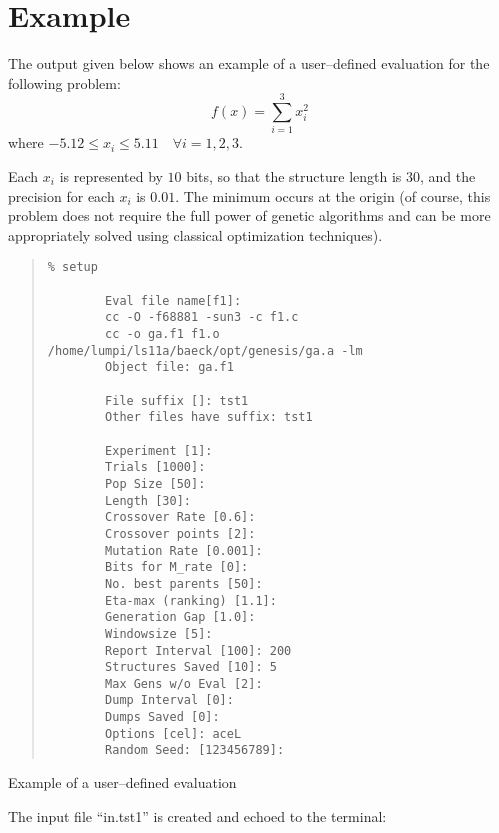 %
%

\section{Example}\label{genesis-exm}
 
            The output given below shows an example of a user--defined  
	evaluation for the following problem:
$$ 
       f(x) = \sum_{i=1}^3 {x_i^2}
$$
	where  $-5.12 \leq  x_i \leq  5.11 \quad \forall i=1,2,3$.
 
       Each $x_i$ is represented by $10$ bits,  so  that  the  structure
       length  is  $30$,  and the precision for each $x_i$ is $0.01$.  The
       minimum occurs at the origin  (of course, this problem does
       not  require the full power of genetic algorithms and can be
       more appropriately solved using classical optimization techniques).

\begin{quote}
\begin{verbatim}
% setup

        Eval file name[f1]:
        cc -O -f68881 -sun3 -c f1.c
        cc -o ga.f1 f1.o /home/lumpi/ls11a/baeck/opt/genesis/ga.a -lm
        Object file: ga.f1

        File suffix []: tst1
        Other files have suffix: tst1
 
        Experiment [1]:
        Trials [1000]:
        Pop Size [50]:
        Length [30]:
        Crossover Rate [0.6]:
        Crossover points [2]:
        Mutation Rate [0.001]:
        Bits for M_rate [0]:
        No. best parents [50]:
        Eta-max (ranking) [1.1]: 
        Generation Gap [1.0]:
        Windowsize [5]:
        Report Interval [100]: 200
        Structures Saved [10]: 5
        Max Gens w/o Eval [2]:
        Dump Interval [0]:
        Dumps Saved [0]:
        Options [cel]: aceL
        Random Seed: [123456789]:
\end{verbatim}
\end{quote}

\begin{center}
\small{Example of a user--defined evaluation}\\
\end{center}
 
       The input file ``in.tst1'' is created and echoed to the terminal:


